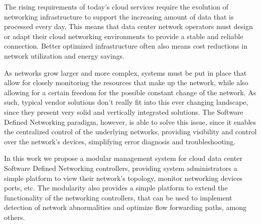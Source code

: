 The rising requirements of today's cloud services require the evolution of networking infrastructure to support the increasing amount of data that is processed
every day. This means that data center network operators must design or adapt their cloud networking environments to provide a stable and reliable connection.
Better optimized infrastructure often also means cost reductions in network utilization and energy savings.

\par As networks grow larger and more complex, systems must be put in place that allow for closely monitoring the resources that make up the network, while also 
allowing for a certain freedom for the possible constant change of the network. As such, typical vendor solutions don't really fit into this ever changing landscape,
since they present very solid and vertically integrated solutions. The Software Defined Networking paradigm, however, is able to solve this issue, since it enables
the centralized control of the underlying networks, providing visibility and control over the network's devices, simplifying error diagnosis and troubleshooting. 

\par In this work we propose a modular management system for cloud data center Software Defined Networking controllers, providing system administrators a simple
platform to view their network's topology, monitor networking devices ports, etc. The modularity also provides a simple platform to extend the functionality 
of the networking controllers, that can be used to implement detection of network abnormalities and optimize flow forwarding paths, among others.
